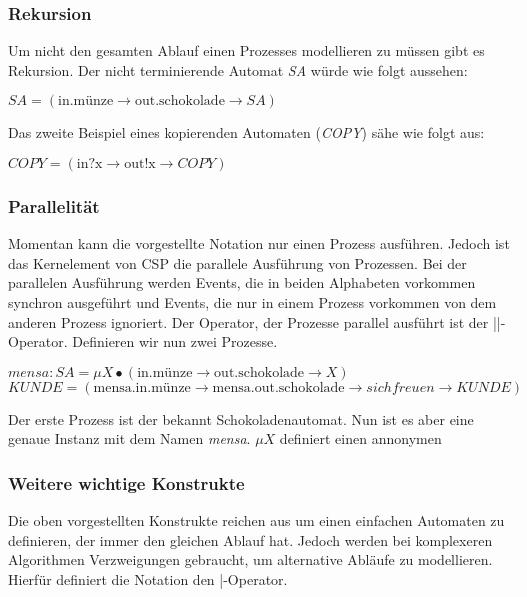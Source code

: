 \subsubsection{Rekursion}
Um nicht den gesamten Ablauf einen Prozesses modellieren zu müssen gibt es Rekursion. Der nicht terminierende Automat \textit{SA} würde wie folgt aussehen:
\begin{addmargin}[1cm]{0cm}
$SA = (\text{in.münze} \rightarrow \text{out.schokolade} \rightarrow SA)$
\end{addmargin}

Das zweite Beispiel eines kopierenden Automaten (\textit{COPY}) sähe wie folgt aus:

\begin{addmargin}[1cm]{0cm}
$COPY = (\text{in?x} \rightarrow \text{out!x} \rightarrow COPY)$
\end{addmargin}

\subsubsection{Parallelität}
Momentan kann die vorgestellte Notation nur einen Prozess ausführen. Jedoch ist das Kernelement von \ac{CSP} die parallele Ausführung von Prozessen. Bei der parallelen Ausführung werden Events, die in beiden Alphabeten vorkommen synchron ausgeführt und Events, die nur in einem Prozess vorkommen von dem anderen Prozess ignoriert. Der Operator, der Prozesse parallel ausführt ist der ||-Operator. Definieren wir nun zwei Prozesse.

\begin{addmargin}[1cm]{0cm}
$mensa:SA = \mu X \bullet (\text{in.münze} \rightarrow \text{out.schokolade} \rightarrow X)$\\
$KUNDE = (\text{mensa.in.münze} \rightarrow \text{mensa.out.schokolade} \rightarrow sichfreuen \rightarrow  KUNDE)$
\end{addmargin}

Der erste Prozess ist der bekannt Schokoladenautomat. Nun ist es aber eine genaue Instanz mit dem Namen \textit{mensa}. $\mu X$ definiert einen annonymen

\hierweiter


\subsubsection{Weitere wichtige Konstrukte}
Die oben vorgestellten Konstrukte reichen aus um einen einfachen Automaten zu definieren, der immer den gleichen Ablauf hat. Jedoch werden bei komplexeren Algorithmen Verzweigungen gebraucht, um alternative Abläufe zu modellieren. Hierfür definiert die Notation den |-Operator.





